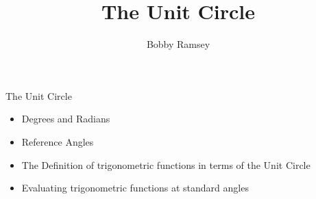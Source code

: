 \documentclass{ximera}
\author{Bobby Ramsey}
\title{The Unit Circle}
\begin{document}
\begin{abstract}
\end{abstract}
\maketitle


\begin{objectives}
	\item The Unit Circle
		\begin{itemize}
			\item Degrees and Radians
			\item Reference Angles
			\item The Definition of trigonometric functions in terms of the Unit Circle 
			\item Evaluating trigonometric functions at standard angles
		\end{itemize}
\end{objectives}
\end{document}
